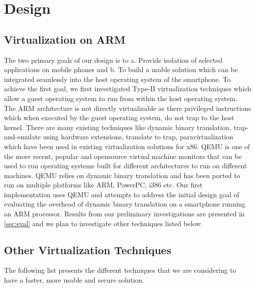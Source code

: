 \section{Design}
\label{sec:design}

\subsection{Virtualization on ARM}
The two primary goals of our design is to a. Provide isolation of selected applications on mobile phones and b. To build a usable solution which can be integrated seamlessly into the host operating system of the smartphone. To achieve the first goal, we first investigated Type-II virtualization techniques which allow a guest operating system to run from within the host operating system. The ARM architecture is not directly virtualizable as there privileged instructions which when executed by the guest operating system, do not trap to the host kernel. There are many existing techniques like dynamic binary translation, trap-and-emulate using hardware extensions, translate to trap, paravirtualization which have been used in existing virtualization solutions for x86. QEMU \cite{qemu} is one of the more recent, popular and opensource virtual machine monitors that can be used to run operating systems built for different architectures to run on different machines. QEMU relies on dynamic binary translation and has been ported to run on multiple platforms like ARM, PowerPC, i386 etc. Our first implementation uses QEMU and attempts to address the initial design goal of evaluating the overhead of dynamic binary translation on a smartphone running an ARM processor. Results from our preliminary investigations are presented in \ref{sec:eval} and we plan to investigate other techniques listed below.

\subsection{Other Virtualization Techniques}
The following list presents the different techniques that we are considering to have a faster, more usable and secure solution.
